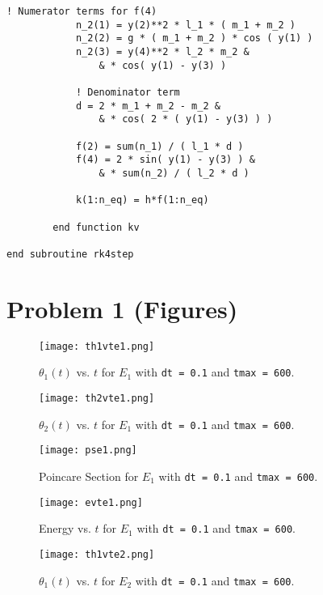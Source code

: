 \documentclass[12pt]{article}
\begin{document}
\begin{lstlisting}[frame=single,caption={The Program {\tt dubpen.f90}.},label=dubpen]
            ! Numerator terms for f(4)
            n_2(1) = y(2)**2 * l_1 * ( m_1 + m_2 )
            n_2(2) = g * ( m_1 + m_2 ) * cos ( y(1) )
            n_2(3) = y(4)**2 * l_2 * m_2 &
                & * cos( y(1) - y(3) )

            ! Denominator term
            d = 2 * m_1 + m_2 - m_2 &
                & * cos( 2 * ( y(1) - y(3) ) )

            f(2) = sum(n_1) / ( l_1 * d )
            f(4) = 2 * sin( y(1) - y(3) ) &
                & * sum(n_2) / ( l_2 * d )

            k(1:n_eq) = h*f(1:n_eq)

        end function kv

end subroutine rk4step

\end{lstlisting}

\section{Problem 1 (Figures)}

\begin{figure}[H]
\texttt{[image: th1vte1.png]}
\caption{$\theta_1(t)$ vs. $t$ for $E_1$ with {\tt dt = 0.1} and {\tt tmax = 600}.}
\label{th1vte1}
\end{figure}

\begin{figure}[H]
\texttt{[image: th2vte1.png]}
\caption{$\theta_2(t)$ vs. $t$ for $E_1$ with {\tt dt = 0.1} and {\tt tmax = 600}.}
\label{th2vte1}
\end{figure}

\begin{figure}[H]
\texttt{[image: pse1.png]}
\caption{Poincare Section for $E_1$ with {\tt dt = 0.1} and {\tt tmax = 600}.}
\label{pse1}
\end{figure}

\begin{figure}[H]
\texttt{[image: evte1.png]}
\caption{Energy vs. $t$ for $E_1$ with {\tt dt = 0.1} and {\tt tmax = 600}.}
\label{evte1}
\end{figure}

\begin{figure}[H]
\texttt{[image: th1vte2.png]}
\caption{$\theta_1(t)$ vs. $t$ for $E_2$ with {\tt dt = 0.1} and {\tt tmax = 600}.}
\label{th1vte2}
\end{figure}
\end{document}
